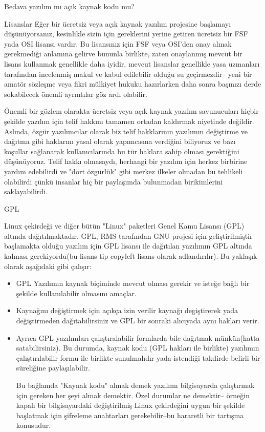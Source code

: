 \documentclass[10pt,a5paper]{book}
\begin{document}
\begin{section}{Bedava yazılım mı açık kaynak kodu mu?}
\begin{subsection}{Lisanslar}
Eğer bir ücretsiz veya açık kaynak yazılım projesine başlamayı düşünüyorsanız, kesinlikle sizin için  gereklerini yerine getiren ücretsiz bir FSF yada OSI lisansı vardır. Bu lisansınız için FSF veya OSI'den onay almak gerekmediği anlamına gelirve bununla birlikte, zaten onaylanmış mevcut bir lisans kullanmak genellikle daha iyidir, mevcut lisanslar genellikle yasa uzmanları tarafından incelenmiş makul ve kabul edilebilir olduğu su geçirmezdir--
yeni bir amatör sözleşme veya fikri mülkiyet hukuku hazırlarken daha sonra başınızı derde sokabilecek önemli ayrıntılar göz ardı olabilir.

Önemli bir gözlem olarakta ücretsiz veya açık kaynak yazılım savunucuları hiçbir şekilde  yazılım için telif hakkını tamamen ortadan kaldırmak niyetinde değildir. Aslında, özgür yazılımcılar olarak biz telif hakklarının yazılımın değiştirme ve dağıtma gibi haklarını yasal olarak yapımcısına verdiğini biliyoruz ve bazı koşullar sağlanarak kullanıcılarında bu tür haklara sahip olması gerektiğini düşünüyoruz. Telif hakkı olmasaydı, herhangi bir yazılım için herkez birbirine yardım edebilirdi ve "dört özgürlük" gibi merkez ilkeler olmadan bu tehlikeli olabilirdi çünkü insanlar hiç bir paylaşımda bulunmadan birikimlerini saklayabilirdi.
\end{subsection}
\begin{subsection}{GPL}

Linux çekirdeği ve diğer bütün "Linux" paketleri Genel Kamu Lisansı (GPL) altında dağıtılmaktadır. GPL, RMS tarafından GNU projesi için geliştirilmiştir başlamakta olduğu yazılım için GPL lisansı ile dağıtılan yazılımın GPL altında kalması gerekiyordu(bu lisans tip copyleft lisans olarak adlandırılır). Bu yaklaşık olarak aşağıdaki gibi çalışır:

\begin{itemize}
 \item GPL Yazılımın kaynak biçiminde mevcut olması gerekir ve isteğe bağlı bir şekilde kullanılabilir olmasını amaçlar.
 \item Kaynağını değiştirmek için açıkça izin verilir kaynağı degiştirerek yada değiştirmeden dağıtabilirsiniz ve GPL bir sonraki alıcıyada aynı hakları verir.
 \item Ayrıca  GPL yazılımları çalıştıralabilir  formlarda bile dağıtmak münkün(hatta satabilirsiniz). Bu durumda, kaynak kodu (GPL hakları ile birlikte) yazılımın çalıştırılabilir formu ile birlikte sunulmalıdır yada istendiği takdirde belirli bir süreliğine paylaşılabilir.

Bu bağlamda "Kaynak kodu" almak demek yazılımı bilgisayarda çalıştırmak için gereken her şeyi almak demektir. Özel durumlar ne demektir-- örneğin kapalı bir bilgisayardaki değiştirilmiş Linux çekirdeğini uygun bir şekilde başlatmak için şifreleme anahtarları gerekebilir--bu hararetli bir tartışma konusudur.


\end{itemize}
\end{subsection}
\end{section}
\end{document}
